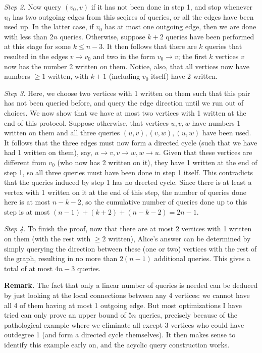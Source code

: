 \documentclass[11pt,a4paper]{article}
\begin{document}
\begin{enumerate}
	
	\emph{Step 2.} 
	Now query $(v_0, v)$ if it has not been done in step 1, and stop whenever $v_0$ has two outgoing edges from this seqires of queries, 
	or all the edges have been used up. 
	In the latter case, if $v_0$ has at most one outgoing edge, then we are done with less than $2n$ queries. 
	Otherwise, suppose $k + 2$ queries have been performed at this stage for some $k\le n - 3$. 
	It then follows that there are $k$ queries that resulted in the edges $v\to v_0$ and two in the form $v_0\to v$; 
	the first $k$ vertices $v$ now has the number 2 written on them. 
	Notice, also, that all vertices now have numbers $\ge 1$ written, with $k+1$ (including $v_0$ itself) have 2 written. 
	
	\emph{Step 3.} 
	Here, we choose two vertices with 1 written on them such that this pair has not been queried before, 
	and query the edge direction until we run out of choices. 
	We now show that we have at most two vertices with 1 written at the end of this protocol. 
	Suppose otherwise, that vertices $u, v, w$ have numbers 1 written on them and all three queries $(u, v), (v, w), (u, w)$ have been used. 
	It follows that the three edges must now form a directed cycle (such that we have had 1 written on them), 
	say, $u\to v, v\to w, w\to u$. 
	Given that these vertices are different from $v_0$ (who now has 2 written on it), 
	they have 1 written at the end of step 1, 
	so all three queries must have been done in step 1 itself. 
	This contradicts that the queries induced by step 1 has no drected cycle. 
	Since there is at least a vertex with 1 written on it at the end of this step, 
	the number of queries done here is at most $n - k - 2$, so the cumulative number of queries done up to this step is at most $(n - 1) + (k + 2) + (n - k - 2) = 2n - 1$. 
	
	\emph{Step 4.} To finish the proof, now that there are at most 2 vertices with 1 written on them (with the rest with $\ge 2$ written), 
	Alice's answer can be determined by simply querying the direction between these (one or two) vertices with the rest of the graph, 
	resulting in no more than $2(n - 1)$ additional queries. 
	This gives a total of at most $4n - 3$ queries. 
	
	\textbf{Remark.} 
	The fact that only a linear number of queries is needed can be deduced by just looking at the local connections between any 4 vertices: 
	we cannot have all 4 of them having at most 1 outgoing edge. But most optimizations I have tried can only prove an upper bound of $5n$ queries, 
	precisely because of the pathological example where we eliminate all except 3 vertices who could have outdegree 1 (and form a directed cycle themselves). 
	It then makes sense to identify this example early on, and the acyclic query construction works. 
\end{enumerate}
\end{document}
